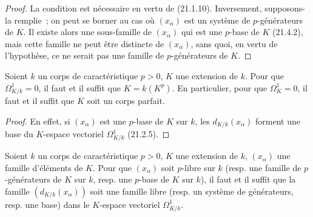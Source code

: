 \begin{proof}
La condition est nécessaire en vertu de (21.1.10). Inversement, supposons-la
remplie~; on peut se borner au cas où $(x_\alpha)$ est un système de
$p$-générateurs de $K$. Il existe alors une sous-famille de $(x_\alpha)$ qui
est une $p$-base de $K$ (21.4.2), mais cette famille ne peut être distincte de
$(x_\alpha)$, sans quoi, en vertu de l'hypothèse, ce ne serait pas une famille
de $p$-générateurs de $K$.
\end{proof}

\begin{corollary}[21.4.4]
\label{0.21.4.4-fr}
Soient $k$ un corps de caractéristique $p>0$, $K$ une extension de $k$.
Pour que $\Omega^1_{K/k}=0$, il faut et il suffit que $K=k(K^p)$.
En particulier, pour que $\Omega^1_K=0$, il faut et il suffit que $K$ soit
un corps parfait.
\end{corollary}

\begin{proof}
En effet, si $(x_\alpha)$ est une $p$-base de $K$ sur $k$, les
$d_{K/k}(x_\alpha)$ forment une base du $K$-espace vectoriel $\Omega^1_{K/k}$
(21.2.5).
\end{proof}

\begin{theorem}[21.4.5]
\label{0.21.4.5-fr}
Soient $k$ un corps de caractéristique $p>0$, $K$ une extension de $k$,
$(x_\alpha)$ une famille d'éléments de $K$. Pour que $(x_\alpha)$ soit
$p$-libre sur $k$ (\textup{resp.} une famille de $p$-générateurs de $K$ sur $k$,
\textup{resp.} une $p$-base de $K$ sur $k$), il faut et il suffit que la famille
$(d_{K/k}(x_\alpha))$ soit une famille libre (\textup{resp.} un système de
générateurs, \textup{resp.} une base) dans le $K$-espace vectoriel $\Omega^1_{K/k}$.
\end{theorem}

